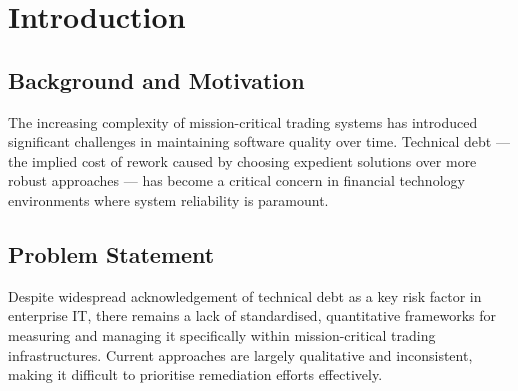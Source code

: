 \documentclass[
  11pt,
  letterpaper,
  11pt,
  oneside,
  english,
  onehalfspacing,
  headsepline]{MastersDoctoralThesis}
\begin{document}
\clearpage





\clearpage





\mainmatter %

\pagestyle{thesis} %
\newcommand{\keyword}[1]{\textbf{#1}}
\newcommand{\tabhead}[1]{\textbf{#1}}
\newcommand{\code}[1]{\texttt{#1}}
\newcommand{\file}[1]{\texttt{\bfseries#1}}
\newcommand{\option}[1]{\texttt{\itshape#1}}



\chapter{Introduction}\label{introduction}

\section{Background and Motivation}\label{background-and-motivation}

The increasing complexity of mission-critical trading systems has
introduced significant challenges in maintaining software quality over
time. Technical debt --- the implied cost of rework caused by choosing
expedient solutions over more robust approaches --- has become a
critical concern in financial technology environments where system
reliability is paramount.

\section{Problem Statement}\label{problem-statement}

Despite widespread acknowledgement of technical debt as a key risk
factor in enterprise IT, there remains a lack of standardised,
quantitative frameworks for measuring and managing it specifically
within mission-critical trading infrastructures. Current approaches are
largely qualitative and inconsistent, making it difficult to prioritise
remediation efforts effectively.
\end{document}
